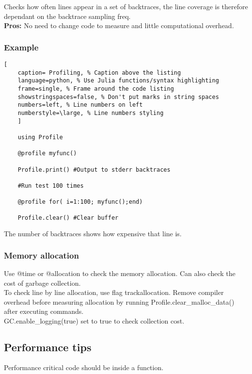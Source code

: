 \documentclass[11pt]{scrartcl} %
\begin{document}
Checks how often lines appear in a set of backtraces, the line coverage is therefore dependant on
the backtrace sampling freq.\\

\textbf{Pros:} No need to change code to measure and little computational overhead.

\subsubsection{Example}

\begin{lstlisting}[
	caption= Profiling, % Caption above the listing
	language=python, % Use Julia functions/syntax highlighting
	frame=single, % Frame around the code listing
	showstringspaces=false, % Don't put marks in string spaces
	numbers=left, % Line numbers on left
	numberstyle=\large, % Line numbers styling
	]

	using Profile

	@profile myfunc()

	Profile.print() #Output to stderr backtraces

	#Run test 100 times

	@profile for( i=1:100; myfunc();end)

	Profile.clear() #Clear buffer

\end{lstlisting}

The number of backtraces shows how expensive that line is. 

\subsubsection{Memory allocation}

Use @time or @allocation to check the memory allocation. Can also check the
cost of garbage collection.\\

To check line by line allocation, use flag track\-allocation. Remove compiler
overhead before measuring allocation by running Profile.clear\_malloc\_data() after
executing commands.\\

GC.enable\_logging(true) set to true to check collection cost.

\subsection{Performance tips}

Performance critical code should be inside a function.\\
\end{document}
